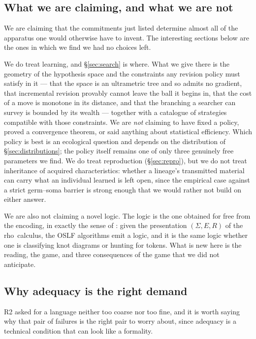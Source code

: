 \documentclass[11pt]{article}
\theoremstyle{plain}
\theoremstyle{definition}
\newcommand{\rhoc}{\textsf{rho}}
\begin{document}
\subsection{What we are claiming, and what we are not}

We are claiming that the commitments just listed determine almost all of the apparatus one would
otherwise have to invent. The interesting sections below are the ones in which we find we had no
choices left.

We do treat learning, and \S\ref{sec:search} is where. What we give there is the geometry of the
hypothesis space and the constraints any revision policy must satisfy in it --- that the space is an
ultrametric tree and so admits no gradient, that incremental revision provably cannot leave the ball it
begins in, that the cost of a move is monotone in its distance, and that the branching a searcher can
survey is bounded by its wealth --- together with a catalogue of strategies compatible with those
constraints. We are \emph{not} claiming to have fixed a policy, proved a convergence theorem, or said
anything about statistical efficiency. Which policy is best is an ecological question and depends on
the distribution of \S\ref{sec:distributions}; the policy itself remains one of only three genuinely
free parameters we find. We do treat reproduction (\S\ref{sec:repro}), but we do not treat inheritance of
acquired characteristics: whether a lineage's transmitted material can carry what an individual
learned is left open, since the empirical case against a strict germ--soma barrier
\cite{Noble} is strong enough that we would rather not build on either answer.

We are also not claiming a novel logic. The logic is the one obtained for free from the encoding, in
exactly the sense of \cite{ClassifierNote}: given the presentation $(\Sigma, E, R)$ of the \rhoc\
calculus, the OSLF algorithms emit a logic, and it is the same logic whether one is classifying knot
diagrams or hunting for tokens. What is new here is the reading, the game, and three consequences of
the game that we did not anticipate.

\subsection{Why adequacy is the right demand}

R2 asked for a language neither too coarse nor too fine, and it is worth saying why that pair of
failures is the right pair to worry about, since adequacy is a technical condition that can look like
a formality.
\end{document}
